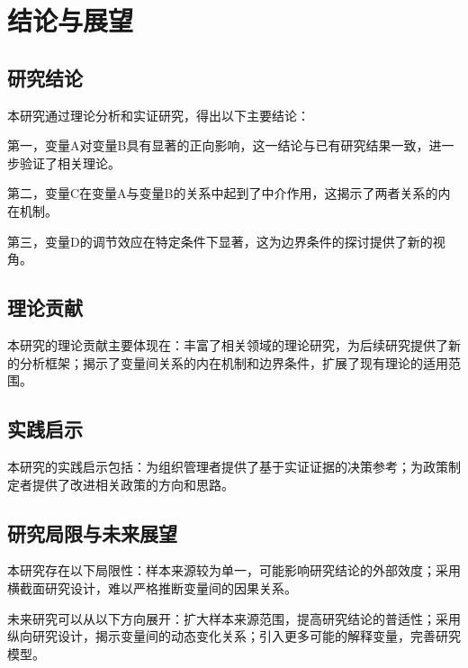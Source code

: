 
\chapter{结论与展望}

\section{研究结论}

本研究通过理论分析和实证研究，得出以下主要结论：

第一，变量A对变量B具有显著的正向影响，这一结论与已有研究结果一致，进一步验证了相关理论。

第二，变量C在变量A与变量B的关系中起到了中介作用，这揭示了两者关系的内在机制。

第三，变量D的调节效应在特定条件下显著，这为边界条件的探讨提供了新的视角。

\section{理论贡献}

本研究的理论贡献主要体现在：丰富了相关领域的理论研究，为后续研究提供了新的分析框架；揭示了变量间关系的内在机制和边界条件，扩展了现有理论的适用范围。

\section{实践启示}

本研究的实践启示包括：为组织管理者提供了基于实证证据的决策参考；为政策制定者提供了改进相关政策的方向和思路。

\section{研究局限与未来展望}

本研究存在以下局限性：样本来源较为单一，可能影响研究结论的外部效度；采用横截面研究设计，难以严格推断变量间的因果关系。

未来研究可以从以下方向展开：扩大样本来源范围，提高研究结论的普适性；采用纵向研究设计，揭示变量间的动态变化关系；引入更多可能的解释变量，完善研究模型。
